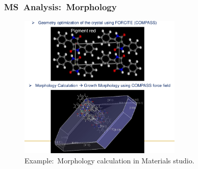 \frame
{
	\frametitle{\textrm{MS~Analysis:~Morphology}}
\begin{figure}[h!]
\centering
\vspace*{-0.18in}
\includegraphics[height=2.70in,width=3.06in,viewport=0 0 817 722,clip]{Figures/MS-Crystallization-example.png}
\caption{\tiny \textrm{Example:~Morphology calculation in Materials studio.}}%
\label{MS-Morphology}
\end{figure}
}


